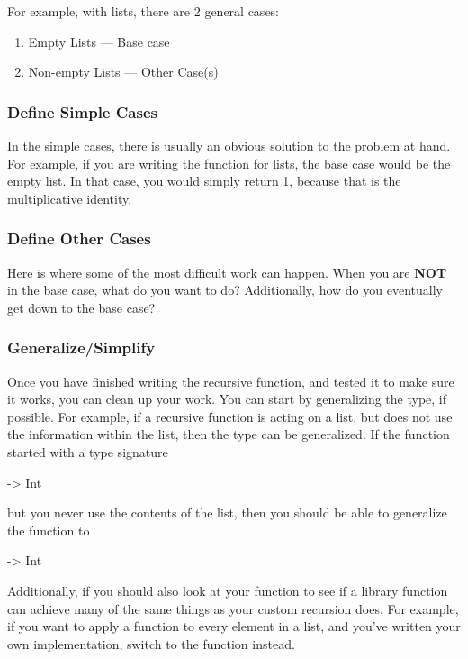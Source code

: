 For example, with lists, there are 2 general cases:
\begin{enumerate}[noitemsep]
\item Empty Lists --- Base case
\item Non-empty Lists --- Other Case(s)
\end{enumerate}

\subsubsection{Define Simple Cases}\label{subsubsec:Help_Recursion-Base_Case}
In the simple cases, there is usually an obvious solution to the problem at hand.
For example, if you are writing the  function for lists, the base case would be the empty list.
In that case, you would simply return 1, because that is the multiplicative identity.

\subsubsection{Define Other Cases}\label{subsubsec:Help_Recursion-Other_Cases}
Here is where some of the most difficult work can happen.
When you are \textbf{NOT} in the base case, what do you want to do?
Additionally, how do you eventually get down to the base case?

\subsubsection{Generalize/Simplify}\label{subsubsec:Help_Recursion-Generalize}
Once you have finished writing the recursive function, and tested it to make sure it works, you can clean up your work.
You can start by generalizing the type, if possible.
For example, if a recursive function is acting on a list, but does not use the information within the list, then the type can be generalized.
If the function started with a type signature
\begin{haskellsource}
[Int] -> Int
\end{haskellsource}
but you never use the contents of the list, then you should be able to generalize the function to
\begin{haskellsource}
[a] -> Int
\end{haskellsource}

Additionally, if you should also look at your function to see if a library function can achieve many of the same things as your custom recursion does.
For example, if you want to apply a function to every element in a list, and you've written your own implementation, switch to the  function instead.

